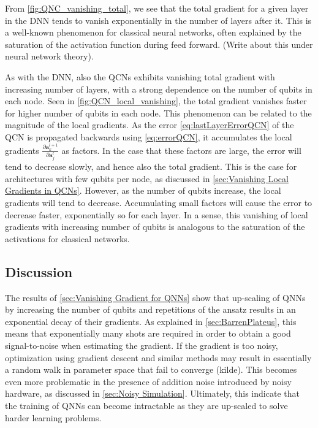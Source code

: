 From \autoref{fig:QNC_vanishing_total}, we see that the total gradient for a given layer in the DNN tends to vanish exponentially in the number of layers after it. This is a well-known phenomenon for classical neural networks, often explained by the saturation of the activation function during feed forward\cite{shalevshwartz2017failures}. (Write about this under neural network theory).

As with the DNN, also the QCNs exhibits vanishing total gradient with increasing number of layers, with a strong dependence on the number of qubits in each node. Seen in \autoref{fig:QCN_local_vanishing}, the total gradient vanishes faster for higher number of qubits in each node. This phenomenon can be related to the magnitude of the local gradients. As the error \autoref{eq:lastLayerErrorQCN} of the QCN is propagated backwards using \autoref{eq:errorQCN}, it accumulates the local gradients $\frac{\partial \boldsymbol{a}^{l+1}_k}{\partial \boldsymbol{a}^{l}_j}$ as factors. In the case that these factors are large, the error will tend to decrease slowly, and hence also the total gradient. This is the case for architectures with few qubits per node, as discussed in \autoref{sec:Vanishing Local Gradients in QCNs}. However, as the number of qubits increase, the local gradients will tend to decrease. Accumulating small factors will cause the error to decrease faster, exponentially so for each layer. In a sense, this vanishing of local gradients with increasing number of qubits is analogous to the saturation of the activations for classical networks.

\subsection{Discussion}\label{sec:Vanishing Gradient Phenomenon Discussion}
The results of \autoref{sec:Vanishing Gradient for QNNs} show that up-scaling of QNNs by increasing the number of qubits and repetitions of the ansatz results in an exponential decay of their gradients. As explained in \autoref{sec:BarrenPlateus}, this means that exponentially many shots are required in order to obtain a good signal-to-noise when estimating the gradient. If the gradient is too noisy, optimization using gradient descent and similar methods may result in essentially a random walk in parameter space that fail to converge (kilde). This becomes even more problematic in the presence of addition noise introduced by noisy hardware, as discussed in \autoref{sec:Noisy Simulation}. Ultimately, this indicate that the training of QNNs can become intractable as they are up-scaled to solve harder learning problems.    

